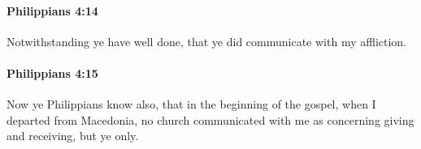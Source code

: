 		\paragraph{Philippians 4:14} %
			\label{PHILIPPIANS-4-14}

			Notwithstanding ye have well done, that ye did communicate with my affliction.

			\begin{framed}
			\scriptsize
				\begin{compactdesc}
					\item[SBLG] 
				\end{compactdesc}
			\end{framed}

		\paragraph{Philippians 4:15} %
			\label{PHILIPPIANS-4-15}

			Now ye Philippians know also, that in the beginning of the gospel, when I departed from Macedonia, no church communicated with me as concerning giving and receiving, but ye only.

